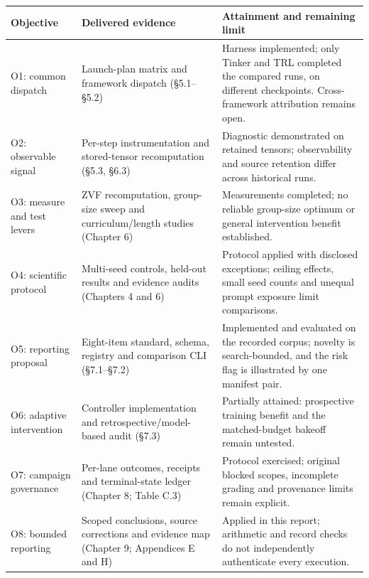 \documentclass[12pt,a4paper]{report}
\providecommand{\real}[1]{#1}          %
\begin{document}
\begingroup\renewcommand{\theHtable}{1objectives}

{\def\LTcaptype{none} %
\begin{longtable}[]{@{}
  >{\raggedright\arraybackslash\hspace{0pt}}p{(\linewidth - 6\tabcolsep) * \real{0.3333}}
  >{\raggedright\arraybackslash\hspace{0pt}}p{(\linewidth - 6\tabcolsep) * \real{0.3333}}
  >{\raggedright\arraybackslash\hspace{0pt}}p{(\linewidth - 6\tabcolsep) * \real{0.3333}}@{}}
\toprule\noalign{}
\begin{minipage}[b]{\linewidth}\raggedright
Objective
\end{minipage} & \begin{minipage}[b]{\linewidth}\raggedright
Delivered evidence
\end{minipage} & \begin{minipage}[b]{\linewidth}\raggedright
Attainment and remaining limit
\end{minipage} \\
\midrule\noalign{}
\endhead
\bottomrule\noalign{}
\endlastfoot
O1: common dispatch & Launch-plan matrix and framework dispatch
(§5.1--§5.2) & Harness implemented; only Tinker and TRL completed the
compared runs, on different checkpoints. Cross-framework attribution
remains open. \\
O2: observable signal & Per-step instrumentation and stored-tensor
recomputation (§5.3, §6.3) & Diagnostic demonstrated on retained
tensors; observability and source retention differ across historical
runs. \\
O3: measure and test levers & ZVF recomputation, group-size sweep and
curriculum/length studies (Chapter 6) & Measurements completed; no
reliable group-size optimum or general intervention benefit
established. \\
O4: scientific protocol & Multi-seed controls, held-out results and
evidence audits (Chapters 4 and 6) & Protocol applied with disclosed
exceptions; ceiling effects, small seed counts and unequal prompt
exposure limit comparisons. \\
O5: reporting proposal & Eight-item standard, schema, registry and
comparison CLI (§7.1--§7.2) & Implemented and evaluated on the recorded
corpus; novelty is search-bounded, and the risk flag is illustrated by
one manifest pair. \\
O6: adaptive intervention & Controller implementation and
retrospective/model-based audit (§7.3) & Partially attained: prospective
training benefit and the matched-budget bakeoff remain untested. \\
O7: campaign governance & Per-lane outcomes, receipts and terminal-state
ledger (Chapter 8; Table C.3) & Protocol exercised; original blocked
scopes, incomplete grading and provenance limits remain explicit. \\
O8: bounded reporting & Scoped conclusions, source corrections and
evidence map (Chapter 9; Appendices E and H) & Applied in this report;
arithmetic and record checks do not independently authenticate every
execution. \\
\end{longtable}
}
\end{document}
